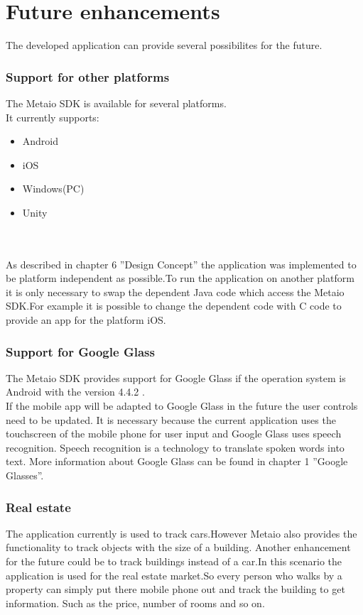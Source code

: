 \chapter{Future enhancements} \label{chapter:Future enhancement and possibilities}

The developed application can provide several possibilites for the future.
\subsection{Support for other platforms}
The Metaio SDK is available for several platforms.  \\It currently supports:
\begin{itemize}
\item Android
\item iOS
\item Windows(PC)
\item Unity
\end{itemize}
 \cite{metaioPlatforms} 
        \\
        \\
As described in chapter 6 ''Design Concept'' the application was implemented to be platform independent as possible.To run the application on another platform it is only necessary to swap the dependent Java code which access the Metaio SDK.For example it is possible to change the dependent code with C code to provide an app for the platform iOS. 


\newpage
\subsection{Support for Google Glass}
The Metaio SDK provides support for Google Glass if the operation system is Android with the version 4.4.2 .\cite{metaioGlass}\\
If the mobile app will be adapted to Google Glass in the future the user controls need to be updated. It is necessary because the current application  uses the touchscreen of the mobile phone  for user input and Google Glass uses speech recognition. Speech recognition is a technology to translate spoken words into text.    
More information about Google Glass can be found in  chapter 1 ''Google Glasses''.   
\subsection{Real estate}
The application currently is used to track cars.However Metaio also provides the functionality to track objects with the size of a building. Another enhancement for the future could be to track buildings instead of a car.In this scenario the application is used for the real estate market.So every person who walks by a property can simply put there mobile phone out and track the building to get information. Such as the price, number of rooms and so on.    
  
\newpage